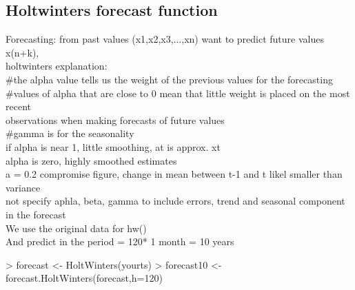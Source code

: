 \documentclass[11pt, a4paper]{article} %
\begin{document}
\subsection{Holtwinters forecast function}
Forecasting: from past values (x1,x2,x3,...,xn) want to predict future values x(n+k), \\
holtwinters explanation: \\
#the alpha value tells us the weight of the previous values for the forecasting \\
#values of alpha that are close to 0 mean that little weight is placed on the most recent \\ observations when making forecasts of future values\\
#gamma is for the seasonality \\
if alpha is near 1, little smoothing, at is approx. xt \\
alpha is zero, highly smoothed estimates\\
a = 0.2 compromise figure, change in mean between t-1 and t likel smaller than variance\\

not specify aphla, beta, gamma to include errors, trend and seasonal component in the forecast\\
We use the original data for hw()\\
And predict in the period = 120* 1 month = 10 years\\
\begin{Schunk}
\begin{Sinput}
> forecast <- HoltWinters(yourts)
> forecast10 <- forecast.HoltWinters(forecast,h=120)
\end{Sinput}
\end{Schunk}
\end{document}
